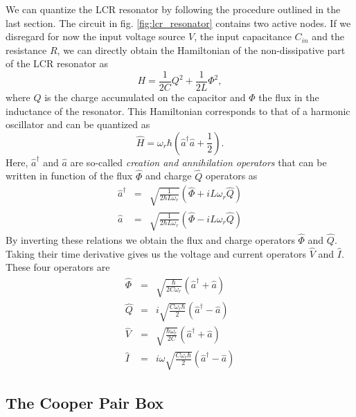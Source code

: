 We can quantize the LCR resonator by following the procedure outlined in the last section. The circuit in fig. \ref{fig:lcr_resonator} contains two active nodes. If we disregard for now the input voltage source $V$, the input capacitance $C_{in}$ and the resistance $R$, we can directly obtain the Hamiltonian of the non-dissipative part of the LCR resonator as
%
\begin{equation}
H = \frac{1}{2C}Q^2+\frac{1}{2L}\Phi^2,
\end{equation}
%
where $Q$ is the charge accumulated on the capacitor and $\Phi$ the flux in the inductance of the resonator. This Hamiltonian corresponds to that of a harmonic oscillator and can be quantized as
%
\begin{equation}
\hat{H} = \omega_r\hbar\left(\hat{a}^\dagger\hat{a}+\frac{1}{2}\right). \label{eq:lc_hamiltonian}
\end{equation}
%
Here, $\hat{a}^\dagger$ and $\hat{a}$ are so-called {\it creation and annihilation operators} that can be written in function of the flux $\hat{\Phi}$ and charge $\hat{Q}$ operators as
%
\begin{eqnarray}
\hat{a}^\dagger & = & \sqrt{\frac{1}{2\hbar L \omega_r}}\left(\hat{\Phi}+iL\omega_r \hat{Q}\right)\\
\hat{a} & = & \sqrt{\frac{1}{2\hbar L\omega_r}}\left( \hat{\Phi}-iL\omega_r \hat{Q}\right)
\end{eqnarray}
%
By inverting these relations we obtain the flux and charge operators $\hat{\Phi}$ and $\hat{Q}$. Taking their time derivative gives us the voltage and current operators $\hat{V}$ and $\hat{I}$. These four operators are
%
\begin{eqnarray}
\hat{\Phi} & = & \sqrt{\frac{\hbar}{2C\omega_r}}\left(\hat{a}^\dagger+\hat{a}\right) \\
\hat{Q} & = & i\sqrt{\frac{C\omega_r\hbar}{2}}\left(\hat{a}^\dagger-\hat{a}\right) \\
\hat{V} & = & \sqrt{\frac{\hbar\omega_r}{2C}}\left(\hat{a}^\dagger+\hat{a}\right) \\
\hat{I} & = & i\omega\sqrt{\frac{C\omega_r\hbar}{2}}\left(\hat{a}^\dagger-\hat{a}\right)
\end{eqnarray}
%

\subsection{The Cooper Pair Box}

